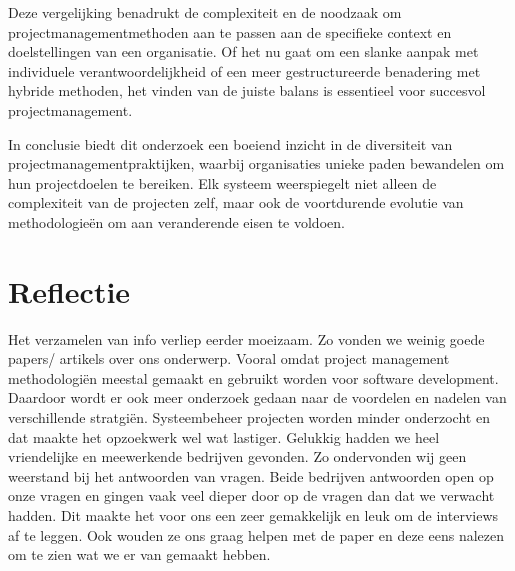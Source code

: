 \documentclass[dutch]{hogent-article}
\begin{document}
Deze vergelijking benadrukt de complexiteit en de noodzaak om projectmanagementmethoden aan te passen aan de specifieke context en doelstellingen van een organisatie. Of het nu gaat om een slanke aanpak met individuele verantwoordelijkheid of een meer gestructureerde benadering met hybride methoden, het vinden van de juiste balans is essentieel voor succesvol projectmanagement.
\newline

In conclusie biedt dit onderzoek een boeiend inzicht in de diversiteit van projectmanagementpraktijken, waarbij organisaties unieke paden bewandelen om hun projectdoelen te bereiken. Elk systeem weerspiegelt niet alleen de complexiteit van de projecten zelf, maar ook de voortdurende evolutie van methodologieën om aan veranderende eisen te voldoen.
\newline

\section{Reflectie}
\label{sec:reflectie}

Het verzamelen van info verliep eerder moeizaam. Zo vonden we weinig goede papers/ artikels over ons onderwerp. Vooral omdat project management methodologi\"en meestal gemaakt en gebruikt worden voor software development. Daardoor wordt er ook meer onderzoek gedaan naar de voordelen en nadelen van verschillende stratgi\"en. Systeembeheer projecten worden minder onderzocht en dat maakte het opzoekwerk wel wat lastiger. Gelukkig hadden we heel vriendelijke en meewerkende bedrijven gevonden. Zo ondervonden wij geen weerstand bij het antwoorden van vragen. Beide bedrijven antwoorden open op onze vragen en gingen vaak veel dieper door op de vragen dan dat we verwacht hadden. Dit maakte het voor ons een zeer gemakkelijk en leuk om de interviews af te leggen. Ook wouden ze ons graag helpen met de paper en deze eens nalezen om te zien wat we er van gemaakt hebben. 

\end{document}
